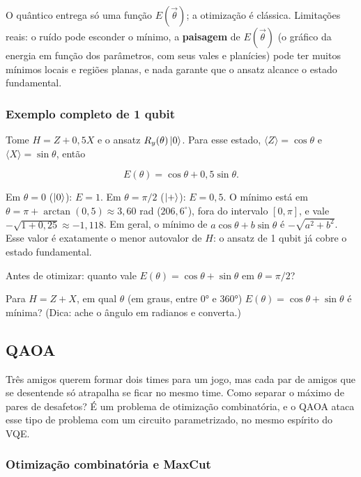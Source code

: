 O quântico entrega só uma função \(E(\vec\theta)\); a otimização é clássica. Limitações reais: o ruído pode esconder o mínimo, a \textbf{paisagem} de \(E(\vec\theta)\) (o gráfico da energia em função dos parâmetros, com seus vales e planícies) pode ter muitos mínimos locais e regiões planas, e nada garante que o ansatz alcance o estado fundamental.

\subsubsection{Exemplo completo de 1 qubit}\label{exemplo-completo-de-1-qubit}

Tome \(H = Z + 0{,}5X\) e o ansatz \(R_y(\theta)\left|{0}\right>\). Para esse estado, \(\langle Z\rangle = \cos\theta\) e \(\langle X\rangle = \sin\theta\), então

\[
E(\theta) = \cos\theta + 0{,}5\sin\theta.
\]

Em \(\theta=0\) (\(\left|{0}\right>\)): \(E=1\). Em \(\theta = \pi/2\) (\(\left|{+}\right>\)): \(E = 0{,}5\). O mínimo está em \(\theta = \pi + \arctan(0{,}5) \approx 3{,}60\) rad (\(206{,}6^\circ\)), fora do intervalo \([0,\pi]\), e vale \(-\sqrt{1+0{,}25} \approx -1{,}118\). Em geral, o mínimo de \(a\cos\theta + b\sin\theta\) é \(-\sqrt{a^2+b^2}\). Esse valor é exatamente o menor autovalor de \(H\): o ansatz de 1 qubit já cobre o estado fundamental.

Antes de otimizar: quanto vale \(E(\theta) = \cos\theta + \sin\theta\) em \(\theta = \pi/2\)?

Para \(H = Z + X\), em qual \(\theta\) (em graus, entre 0° e 360°) \(E(\theta) = \cos\theta + \sin\theta\) é mínima? (Dica: ache o ângulo em radianos e converta.)

\subsection{QAOA}
Três amigos querem formar dois times para um jogo, mas cada par de amigos que se desentende só atrapalha se ficar no mesmo time. Como separar o máximo de pares de desafetos? É um problema de otimização combinatória, e o QAOA ataca esse tipo de problema com um circuito parametrizado, no mesmo espírito do VQE.

\subsubsection{Otimização combinatória e MaxCut}\label{otimizauxe7uxe3o-combinatuxf3ria-e-maxcut}

